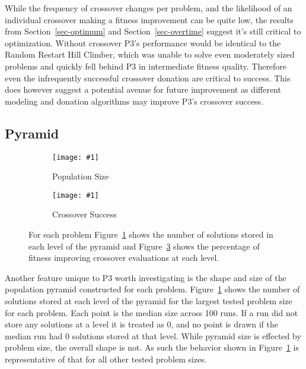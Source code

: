\documentclass[twoside]{article}
\newcommand{\includegraphicsfit}[1]
{\texttt{[image: \#1]}}
\begin{document}
While the frequency of crossover changes per problem, and the likelihood of an individual crossover making a fitness improvement can be
quite low, the results from Section~\ref{sec-optimum} and Section~\ref{sec-overtime} suggest it's still critical to optimization. Without
crossover P3's performance would be identical to the Random Restart Hill Climber, which was unable to solve even moderately sized problems
and quickly fell behind P3 in intermediate fitness quality. Therefore even the infrequently successful crossover donation are
critical to success. This does however suggest a potential avenue for future improvement as different modeling and donation algorithms
may improve P3's crossover success.

\subsection{Pyramid}
\begin{figure}[t]
  \begin{centering}
    \begin{subfigure}{.5\textwidth}
      \begin{centering}
        \includegraphicsfit{level-size}
      \end{centering}
      \caption{Population Size}
      \label{fig-level-size}
    \end{subfigure}%
    \begin{subfigure}{.5\textwidth}
      \begin{centering}
        \includegraphicsfit{level-success}
      \end{centering}
      \caption{Crossover Success}
      \label{fig-level-success}
    \end{subfigure}
  \end{centering}
  \caption{For each problem Figure~\ref{fig-level-size} shows the number of solutions stored in each level of the pyramid
           and Figure~\ref{fig-level-success} shows the percentage of fitness improving crossover evaluations at each level.}
\end{figure}

Another feature unique to P3 worth investigating is the shape and size of the population pyramid
constructed for each problem. Figure~\ref{fig-level-size} shows the number of solutions stored at
each level of the pyramid for the largest tested problem size for each problem. Each point is the
median size across 100 runs. If a run did not store any solutions at a level it is treated as 0,
and no point is drawn if the median run had 0 solutions stored at that level. While pyramid size
is effected by problem size, the overall shape is not. As such the behavior shown in Figure~\ref{fig-level-size}
is representative of that for all other tested problem sizes.
\end{document}
